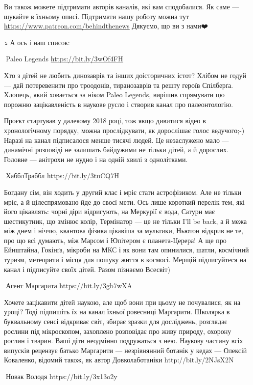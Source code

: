 Ви також можете підтримати авторів каналів, які вам сподобалися. Як саме —
шукайте в їхньому описі. Підтримати нашу роботу можна тут
\url{https://www.patreon.com/behindthenews} Дякуємо, що ви з нами❤️🖤

⤵️ А ось і наш список:

🦉Paleo Legends \url{https://bit.ly/3wOf4FH}

Хто з дітей не любить динозаврів та інших доісторичних істот? Хлібом не годуй — дай потеревенити про троодонів, тиранозаврів та решту героїв Спілберґа. Хлопець, який ховається за ніком Paleo Legends, вирішив спрямувати цю порожню зацікавленість в наукове русло і створив канал про палеонтологію.

Проєкт стартував у далекому 2018 році, тож якщо дивитися відео в хронологічному порядку, можна прослідкувати, як дорослішає голос ведучого;-) Наразі на канал підписалося менше тисячі людей. Це незаслужено мало — динамічні розповіді не залишать байдужими не тільки дітей, а й дорослих. Головне — анітрохи не нудно і на одній хвилі з однолітками.

🦉ХабблТраббл \url{https://bit.ly/3tuCQ7H}

Богдану сім, він ходить у другий клас і мріє стати астрофізиком. Але не тільки
мріє, а й цілеспрямовано йде до своєї мети. Ось лише короткий перелік тем, які
його цікавлять: чорні діри відригують, на Меркурії є вода, Сатурн має
шестикутник, що змінює колір, Термінатор — це не тільки I'll be back, а й межа
між днем і ніччю, квантова фізика цікавіша за мультики, Ньютон відкрив не те,
про що всі думають, між Марсом і Юпітером є планета-Церера! А ще про Ейнштайна,
Гокінґа, мікроби на МКС і як вони там опинилися, шатли, космічний туризм,
метеорити і місця для пошуку життя в космосі. Мерщій підписуйтеся на канал і
підписуйте своїх дітей. Разом пізнаємо Всесвіт)

🦉Агент Маргарита https://bit.ly/3gb7wXA

Хочете зацікавити дітей наукою, але щоб вони при цьому не почувалися, як на уроці? Тоді підпишіть їх на канал їхньої ровесниці Маргарити. Школярка в буквальному сенсі відкриває світ, збирає зразки для досліджень, розглядає рослини під мікроскопом, захоплено розповідає про живу природу, охорону рослин і тварин. Ваші діти неодмінно подружаться з нею. Наукову частину всіх випусків рецензує батько Маргарити — незрівнянний ботанік у кедах — Олексій Коваленко, відомий також, як автор Довколаботаніки http://bit.ly/2NJsX2N

🦉Новак Володя https://bit.ly/3x13o2y 

